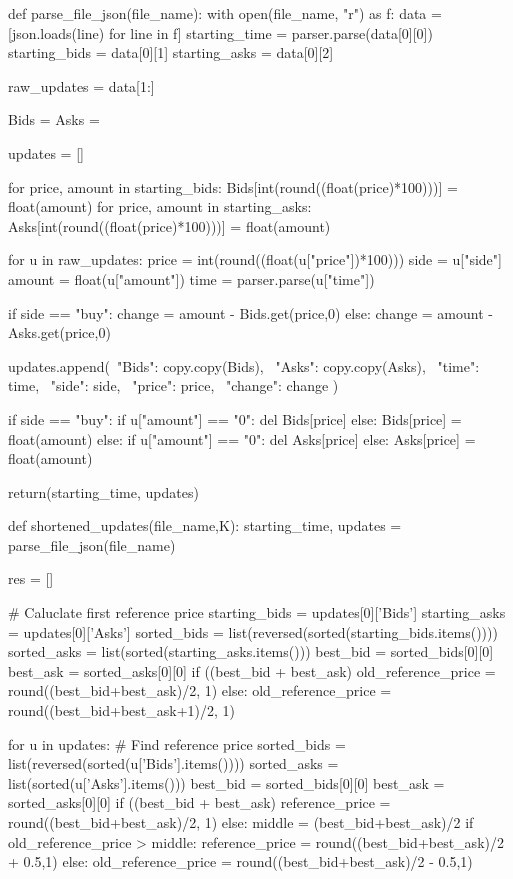 def parse_file_json(file_name):
    with open(file_name, "r") as f:
        data = [json.loads(line) for line in f]
    starting_time = parser.parse(data[0][0])
    starting_bids = data[0][1]
    starting_asks = data[0][2]
    
    raw_updates = data[1:]
    
    Bids = {}
    Asks = {}    
    
    updates = []
    
    for price, amount in starting_bids:
        Bids[int(round((float(price)*100)))] = float(amount)
    for price, amount in starting_asks:
        Asks[int(round((float(price)*100)))] = float(amount)
        
    for u in raw_updates:
        price = int(round((float(u["price"])*100)))  
        side = u["side"]
        amount = float(u["amount"])
        time = parser.parse(u["time"])
        
        if side == "buy":
            change = amount - Bids.get(price,0)
        else:
            change = amount - Asks.get(price,0)
        
        updates.append({\
            "Bids": copy.copy(Bids), \
            "Asks": copy.copy(Asks), \
            "time": time, \
            "side": side, \
            "price": price, \
            "change": change            
        })
        
        if side == "buy":
            if u["amount"] == "0":
                del Bids[price]
            else:
                Bids[price] = float(amount)
        else:
            if u["amount"] == "0":
                del Asks[price]
            else:
                Asks[price] = float(amount)   

    return(starting_time, updates)
    
def shortened_updates(file_name,K):
    starting_time, updates = parse_file_json(file_name)
    
    res = []
    
    # Caluclate first reference price
    starting_bids = updates[0]['Bids']
    starting_asks = updates[0]['Asks']
    sorted_bids = list(reversed(sorted(starting_bids.items())))
    sorted_asks = list(sorted(starting_asks.items()))        
    best_bid = sorted_bids[0][0]
    best_ask = sorted_asks[0][0]
    if ((best_bid + best_ask) %
        old_reference_price = round((best_bid+best_ask)/2, 1)
    else:
        old_reference_price = round((best_bid+best_ask+1)/2, 1)
            
    for u in updates:      
        # Find reference price
        sorted_bids = list(reversed(sorted(u['Bids'].items())))
        sorted_asks = list(sorted(u['Asks'].items()))        
        best_bid = sorted_bids[0][0]
        best_ask = sorted_asks[0][0]
        if ((best_bid + best_ask) %
            reference_price = round((best_bid+best_ask)/2, 1)
        else:
            middle = (best_bid+best_ask)/2
            if old_reference_price > middle:
                reference_price = round((best_bid+best_ask)/2 + 0.5,1)
            else:
                old_reference_price = round((best_bid+best_ask)/2 - 0.5,1)
                
